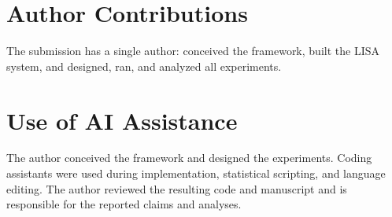 \documentclass{article}
\begin{document}
\section*{Author Contributions}
The submission has a single author: conceived the framework, built the LISA system, and designed, ran, and analyzed all experiments.

\section*{Use of AI Assistance}
The author conceived the framework and designed the experiments. Coding assistants were used during implementation, statistical scripting, and language editing. The author reviewed the resulting code and manuscript and is responsible for the reported claims and analyses.
\end{document}
